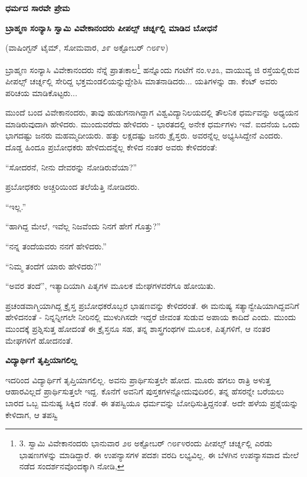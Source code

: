 \begin{center}
\textbf{ಧರ್ಮದ ಸಾರವೇ ಪ್ರೇಮ}
\end{center}

\begin{center}
\textbf{ಬ್ರಾಹ್ಮಣ ಸಂನ್ಯಾಸಿ ಸ್ವಾಮಿ ವಿವೇಕಾನಂದರು ಪೀಪಲ್ಸ್ ಚರ್ಚ್ನಲ್ಲಿ ಮಾಡಿದ ಬೋಧನೆ}
\end{center}

(ವಾಷಿಂಗ್ಟನ್ ಟೈಮ್​, ಸೋಮವಾರ, ೨೯ ಅಕ್ಟೋಬರ್ ೧೮೯೪)

ಬ್ರಾಹ್ಮಣ ಸಂನ್ಯಾಸಿ ವಿವೇಕಾನಂದರು ನೆನ್ನೆ ಪ್ರಾತಃಕಾಲ\footnote{3. ಸ್ವಾಮಿ ವಿವೇಕಾನಂದರು ಭಾನುವಾರ ೨೮ ಅಕ್ಟೋಬರ್ ೧೮೯೪ರಂದು ಪೀಪಲ್ಸ್ ಚರ್ಚ್ನಲ್ಲಿ ಎರಡು ಭಾಷಣಗಳನ್ನು ಮಾಡಿದ್ದಾರೆ. ಈ ಉಪನ್ಯಾಸಗಳ ಪದಶಃ ವರದಿ ಲಭ್ಯವಿಲ್ಲ. ಈ ಬೆಳಗಿನ ಉಪನ್ಯಾಸವಾದ ಮೇಲೆ ನಡೆದ ಸಂದರ್ಶನವೊಂದಕ್ಕಾಗಿ ನೋಡಿ, } ಹನ್ನೊಂದು ಗಂಟೆಗೆ ನಂ.೪೨೩, ವಾಯುವ್ಯ ಜಿ ರಸ್ತೆಯಲ್ಲಿರುವ ಪೀಪಲ್ಸ್ ಚರ್ಚ್ನಲ್ಲಿ ಸೇರಿದ್ದ ಭಕ್ತಮಂಡಲಿಯನ್ನುದ್ದೇಶಿಸಿ ಮಾತನಾಡಿದರು... ಯತಿಗಳನ್ನು ಡಾ. ಕೆಂಟ್ ಅವರು ಪರಿಚಯ ಮಾಡಿಕೊಟ್ಟರು...

ಮುಂದೆ ಬಂದ ವಿವೇಕಾನಂದರು, ತಾವು ಹುಡುಗನಾಗಿದ್ದಾಗ ವಿಶ್ವವಿದ್ಯಾನಿಲಯದಲ್ಲಿ ತೌಲನಿಕ ಧರ್ಮವನ್ನು ಅಧ್ಯಯನ ಮಾಡಿರುವುದಾಗಿ ಹೇಳಿದರು. ಮುಂದುವರೆದು ಹೇಳಿದರು - ಭಾರತದಲ್ಲಿ ಅನೇಕ ಧರ್ಮಗಳು ಇವೆ. ಐದನೆಯ ಒಂದು ಭಾಗದಷ್ಟು ಜನರು ಮಹಮ್ಮದೀಯರು. ಹತ್ತು ಲಕ್ಷದಷ್ಟು ಜನರು ಕ್ರೈಸ್ತರು. ಅವರನ್ನೆಲ್ಲ ಅಭ್ಯಸಿಸಿದ್ದೇನೆ ಎಂದರು. ದೊಡ್ಡ ಹಿಂದೂ ಪ್ರಬೋಧಕರು ಹೇಳಿದುದನ್ನೆಲ್ಲ ಕೇಳಿದ ನಂತರ ಅವರು ಕೇಳಿದರಂತೆ:

“ಸೋದರನೆ, ನೀನು ದೇವರನ್ನು ನೋಡಿರುವೆಯಾ?”

ಪ್ರಬೋಧಕರು ಅಚ್ಚರಿಯಿಂದ ತಲೆಯೆತ್ತಿ ನೋಡಿದರು.

“ಇಲ್ಲ.”

“ಹಾಗಿದ್ದ ಮೇಲೆ, ಇವೆಲ್ಲ ನಿಜವೆಂದು ನಿನಗೆ ಹೇಗೆ ಗೊತ್ತು?”

“ನನ್ನ ತಂದೆಯವರು ನನಗೆ ಹೇಳಿದರು.”

“ನಿಮ್ಮ ತಂದೆಗೆ ಯಾರು ಹೇಳಿದರು?”

“ಅವರ ತಂದೆ”, ಇತ್ಯಾದಿಯಾಗಿ ಪಿತೃಗಳ ಮೂಲಕ ಮೇಘಗಳವರೆಗೂ ಹೋಯಿತು.

ಪ್ರಚಂಡವಾಗ್ಮಿಯಾಗಿದ್ದ ಕ್ರೈಸ್ತ ಪ್ರಬೋಧಕರೊಬ್ಬರ ಭಾಷಣವನ್ನು ಕೇಳಿದರಂತೆ. ಈ ಮನುಷ್ಯ ಸತ್ಯಾನ್ವೇಷಿಯಾಗಿದ್ದವನಿಗೆ ಹೇಳಿದನಂತೆ - ನಿನ್ನನ್ನೀಗಲೇ ನೀರಿನಲ್ಲಿ ಮುಳುಗಿಸದೇ ಇದ್ದರೆ ಜೀವಂತ ಸುಡುವ ಅಪಾಯ ಕಾದಿದೆ ಎಂದು. ಮುಂದು ಮುಂದಕ್ಕೆ ಪ್ರಶ್ನಿಸುತ್ತ ಹೋದಂತೆ ಈ ಕ್ರೈಸ್ತನೂ ಸಹ, ತನ್ನ ಶಾಸ್ತ್ರಗಂಥಗಳ ಮೂಲಕ, ಪಿತೃಗಳಿಗೆ, ಆ ನಂತರ ಮೇಘಗಳಿಗೆ ಹೋದನಂತೆ.

\begin{center}
\textbf{ವಿದ್ಯಾರ್ಥಿಗೆ ತೃಪ್ತಿಯಾಗಲಿಲ್ಲ}
\end{center}

ಇದರಿಂದ ವಿದ್ಯಾರ್ಥಿಗೆ ತೃಪ್ತಿಯಾಗಲಿಲ್ಲ. ಅವನು ಪ್ರಾರ್ಥಿಸುತ್ತಲೇ ಹೋದ. ಮೂರು ಹಗಲು ರಾತ್ರಿ ಅಳುತ್ತ ಆಹಾರವಿಲ್ಲದೆ ಪ್ರಾರ್ಥಿಸುತ್ತಲೇ ಇದ್ದ. ಕೊನೆಗೆ ಅವನಿಗೆ ಪುಸ್ತಕಗಳನ್ನೋದುವುದಿರಲಿ, ತನ್ನ ಹೆಸರನ್ನೇ ಬರೆಯಲು ಬಾರದ ಒಬ್ಬ ಮನುಷ್ಯ ಸಿಕ್ಕಿದ ನಂತೆ. ಈ ತಪಸ್ವಿಯೂ ಧರ್ಮವನ್ನು ಬೋಧಿಸುತ್ತಿದ್ದನಂತೆ. ಅದೇ ಹಳೆಯ ಪ್ರಶ್ನೆಯನ್ನು ಕೇಳಿದಾಗ, ಆ ತಪಸ್ವಿ

